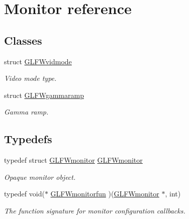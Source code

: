 \hypertarget{group__monitor}{
\section{Monitor reference}
\label{group__monitor}
}
\subsection*{Classes}
\begin{CompactItemize}
\item 
struct \hyperlink{struct_g_l_f_wvidmode}{GLFWvidmode}
\begin{CompactList}\small\item\em Video mode type. \item\end{CompactList}\item 
struct \hyperlink{struct_g_l_f_wgammaramp}{GLFWgammaramp}
\begin{CompactList}\small\item\em Gamma ramp. \item\end{CompactList}\end{CompactItemize}
\subsection*{Typedefs}
\begin{CompactItemize}
\item 
typedef struct \hyperlink{group__monitor_g8d9efd1cde9426692c73fe40437d0ae3}{GLFWmonitor} \hyperlink{group__monitor_g8d9efd1cde9426692c73fe40437d0ae3}{GLFWmonitor}
\begin{CompactList}\small\item\em Opaque monitor object. \item\end{CompactList}\item 
typedef void($\ast$ \hyperlink{group__monitor_g67b74af6cecfdbccc7e57a6319a57210}{GLFWmonitorfun} )(\hyperlink{group__monitor_g8d9efd1cde9426692c73fe40437d0ae3}{GLFWmonitor} $\ast$, int)
\begin{CompactList}\small\item\em The function signature for monitor configuration callbacks. \item\end{CompactList}\end{CompactItemize}
